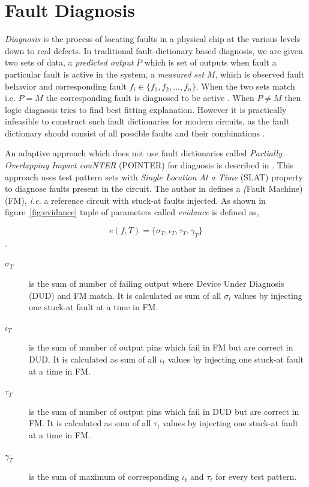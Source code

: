 \section{Fault Diagnosis}
\label{sec:secfd}
\emph{Diagnosis} is the process of locating faults in a physical chip at the various levels down to real defects. In traditional fault-dictionary based diagnosis, we are given two sets of data, a \emph{predicted output} $P$ which is set of outputs when fault a particular fault is active in the system, a \emph{measured set} $M$, which is observed fault behavior and corresponding fault $ f_i \in \{f_1,f_2,...,f_n\} $. When the two sets match i.e. $P = M$ the corresponding fault is diagnosed to be active . When $P \neq M$ then logic diagnosis tries to find best fitting explanation. However it is practically infeasible to construct such fault dictionaries for modern circuits, as the fault dictionary should consist of all possible faults and their combinations \cite{Wang2010}. 

An adaptive approach which does not use fault dictionaries called \emph{Partially Overlapping Impact couNTER} (POINTER) for diagnosis is described in \cite{Holst2009}. This approach uses test pattern sets with \emph{Single Location At a Time} (SLAT) property \cite{Bartenstein2001} to diagnose faults present in the circuit. The author in \cite{Holst2009} defines a \emph(Fault Machine) (FM), \emph{i.e.} a reference circuit with stuck-at faults injected. As shown in figure~\ref{fig:evidance} tuple of parameters called \emph{evidance} is defined as,

\[e(f,T) = \{\sigma_T, \iota_T, \tau_T, \gamma_T\}\]. 

\begin{description}
	\item[$\sigma_T$] is the sum of number of failing output  where Device Under Diagnosis (DUD) and FM match. It is calculated as sum of all $\sigma_t$ values by injecting one stuck-at fault at a time in FM.
	\item[$\iota_T$] is the sum of number of output pins which fail in FM but are correct in DUD. It is calculated as sum of all $\iota_t$ values by injecting one stuck-at fault at a time in FM.
	\item[$\tau_T$] is the sum of number of output pins which fail in DUD but are correct in FM. It is calculated as sum of all $\tau_t$ values by injecting one stuck-at fault at a time in FM.
 	\item[$\gamma_T$] is the sum of maximum of corresponding $\iota_t $ and $\tau_t$ for every test pattern.
\end{description}

